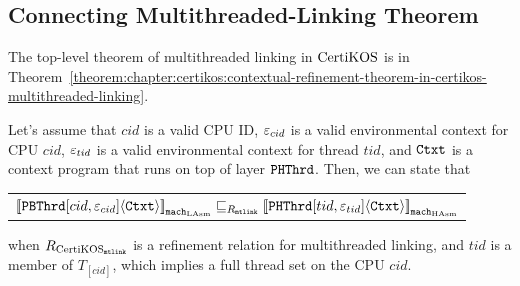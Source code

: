 \subsection{Connecting Multithreaded-Linking Theorem}
\label{chapter:certikos:subsec:connecting-multithreaded-theroem}

The top-level theorem of
multithreaded linking in $\mathrm{CertiKOS}$  is in Theorem~\ref{theorem:chapter:certikos:contextual-refinement-theorem-in-certikos-multithreaded-linking}.

\begin{theorem}
\label{theorem:chapter:certikos:contextual-refinement-theorem-in-certikos-multithreaded-linking}
Let's assume that $cid$ is a valid CPU ID, ${\varepsilon}_{cid}$ is a valid
environmental context for CPU $cid$, 
${\varepsilon}_{tid}$ is a valid
environmental context for thread $tid$, 
and ${\mathrm{\texttt{Ctxt}}}$ is a
 context program that runs on top of layer ${\mathrm{\texttt{PHThrd}}}$. 
 Then, we can state that
 \begin{center}
\begin{tabular}{c}
${[\![{{\mathrm{\texttt{PBThrd}}}[cid, {\varepsilon}_{cid}]} \langle {{\mathrm{\texttt{Ctxt}}}} \rangle]\!]}_{{\mathrm{\texttt{mach}}}_{\mathrm{LAsm}}} \sqsubseteq_{R_{{\mathrm{\texttt{mtlink}}}}} {[\![{{\mathrm{\texttt{PHThrd}}}[tid, {\varepsilon}_{tid}]} \langle {{\mathrm{\texttt{Ctxt}}}} \rangle]\!]}_{{{\mathrm{\texttt{mach}}}_{\mathrm{HAsm}}}}$\\
\end{tabular}
\end{center}
when ${R_{\mathrm{CertiKOS}_{\mathrm{\texttt{mtlink}}}}}$ is a refinement relation for multithreaded linking, and $tid$ is a member of $T_{[cid]}$,
which implies a full thread set on the CPU $cid$.
\end{theorem}


